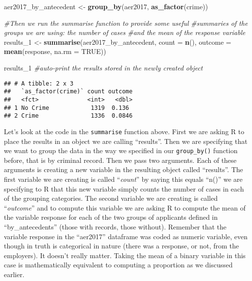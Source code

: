\documentclass[
]{book}
\newenvironment{Shaded}{\begin{snugshade}}{\end{snugshade}}
\newcommand{\AttributeTok}[1]{\textcolor[rgb]{0.13,0.29,0.53}{#1}}
\newcommand{\CommentTok}[1]{\textcolor[rgb]{0.56,0.35,0.01}{\textit{#1}}}
\newcommand{\ConstantTok}[1]{\textcolor[rgb]{0.56,0.35,0.01}{#1}}
\newcommand{\FunctionTok}[1]{\textcolor[rgb]{0.13,0.29,0.53}{\textbf{#1}}}
\newcommand{\NormalTok}[1]{#1}
\newcommand{\OtherTok}[1]{\textcolor[rgb]{0.56,0.35,0.01}{#1}}
\begin{document}
\begin{Shaded}
\begin{Highlighting}[]
\NormalTok{aer2017\_by\_antecedent }\OtherTok{\textless{}{-}} \FunctionTok{group\_by}\NormalTok{(aer2017, }\FunctionTok{as\_factor}\NormalTok{(crime))}

\CommentTok{\#Then we run the summarise function to provide some useful}
\CommentTok{\#summaries of the groups we are using: the number of cases}
\CommentTok{\#and the mean of the response variable}
\NormalTok{results\_1 }\OtherTok{\textless{}{-}} \FunctionTok{summarise}\NormalTok{(aer2017\_by\_antecedent,}
  \AttributeTok{count =} \FunctionTok{n}\NormalTok{(),}
  \AttributeTok{outcome =} \FunctionTok{mean}\NormalTok{(response, }\AttributeTok{na.rm =} \ConstantTok{TRUE}\NormalTok{))}

\NormalTok{results\_1 }\CommentTok{\#auto{-}print the results stored in the newly created object}
\end{Highlighting}
\end{Shaded}

\begin{verbatim}
## # A tibble: 2 x 3
##   `as_factor(crime)` count outcome
##   <fct>              <int>   <dbl>
## 1 No Crime            1319  0.136 
## 2 Crime               1336  0.0846
\end{verbatim}

Let's look at the code in the \texttt{summarise} function above. First we are asking R to place the results in an object we are calling ``results''. Then we are specifying that we want to group the data in the way we specified in our \texttt{group\_by()} function before, that is by criminal record. Then we pass two arguments. Each of these arguments is creating a new variable in the resulting object called ``results''. The first variable we are creating is called ``\emph{count}'' by saying this equals ``n()'' we are specifying to R that this new variable simply counts the number of cases in each of the grouping categories. The second variable we are creating is called ``\emph{outcome}'' and to compute this variable we are asking R to compute the mean of the variable response for each of the two groups of applicants defined in ``by\_antecedents'' (those with records, those without). Remember that the variable response in the ``aer2017'' dataframe was coded as numeric variable, even though in truth is categorical in nature (there was a response, or not, from the employers). It doesn't really matter. Taking the mean of a binary variable in this case is mathematically equivalent to computing a proportion as we discussed earlier.
\end{document}
